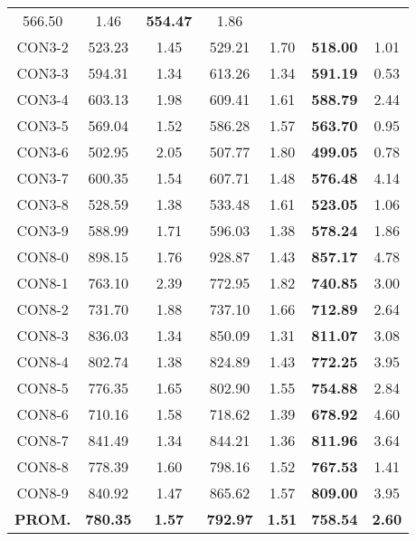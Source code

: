 \begin{table}[ht]
\begin{tabular}{c c c c c c c}
566.50 & 1.46 & \bf{554.47} & 
1.86\\CON3-2 & 523.23 & 1.45 & 
529.21 & 1.70 & \bf{518.00} & 
1.01\\CON3-3 & 594.31 & 1.34 & 
613.26 & 1.34 & \bf{591.19} & 
0.53\\CON3-4 & 603.13 & 1.98 & 
609.41 & 1.61 & \bf{588.79} & 
2.44\\CON3-5 & 569.04 & 1.52 & 
586.28 & 1.57 & \bf{563.70} & 
0.95\\CON3-6 & 502.95 & 2.05 & 
507.77 & 1.80 & \bf{499.05} & 
0.78\\CON3-7 & 600.35 & 1.54 & 
607.71 & 1.48 & \bf{576.48} & 
4.14\\CON3-8 & 528.59 & 1.38 & 
533.48 & 1.61 & \bf{523.05} & 
1.06\\CON3-9 & 588.99 & 1.71 & 
596.03 & 1.38 & \bf{578.24} & 
1.86\\CON8-0 & 898.15 & 1.76 & 
928.87 & 1.43 & \bf{857.17} & 
4.78\\CON8-1 & 763.10 & 2.39 & 
772.95 & 1.82 & \bf{740.85} & 
3.00\\CON8-2 & 731.70 & 1.88 & 
737.10 & 1.66 & \bf{712.89} & 
2.64\\CON8-3 & 836.03 & 1.34 & 
850.09 & 1.31 & \bf{811.07} & 
3.08\\CON8-4 & 802.74 & 1.38 & 
824.89 & 1.43 & \bf{772.25} & 
3.95\\CON8-5 & 776.35 & 1.65 & 
802.90 & 1.55 & \bf{754.88} & 
2.84\\CON8-6 & 710.16 & 1.58 & 
718.62 & 1.39 & \bf{678.92} & 
4.60\\CON8-7 & 841.49 & 1.34 & 
844.21 & 1.36 & \bf{811.96} & 
3.64\\CON8-8 & 778.39 & 1.60 & 
798.16 & 1.52 & \bf{767.53} & 
1.41\\CON8-9 & 840.92 & 1.47 & 
865.62 & 1.57 & \bf{809.00} & 
3.95\\\bf{PROM.} & 
\bf{780.35} & \bf{1.57} & \bf{792.97} & \bf{1.51} & \bf{758.54} & \bf{2.60}\\[1ex]\hline
\end{tabular}
\label{table:nonlin}
\end{table} \clearpage
